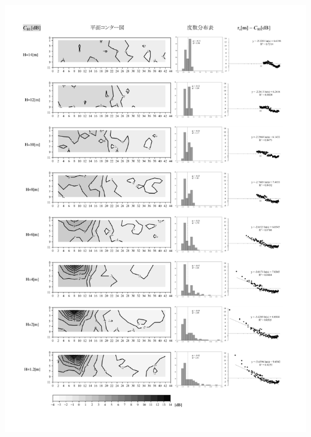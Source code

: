 \newpage
      \begin{minipage}{1\textwidth}
        \centering
          \includegraphics[keepaspectratio,width=1\hsize,angle=0]
                          {04_att/Onkyo_rec1.pdf}
      \end{minipage}
\newpage
